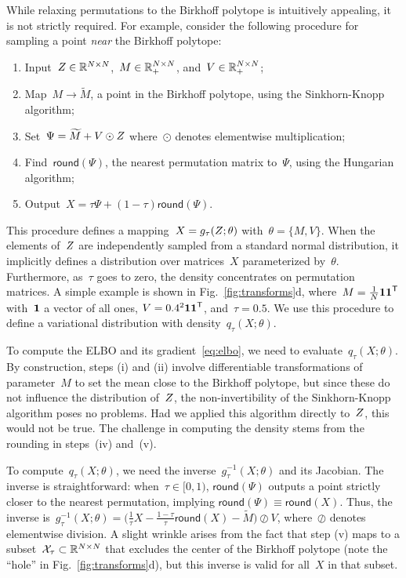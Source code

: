 \documentclass[twoside]{article}
\begin{document}
While relaxing permutations to the Birkhoff polytope is intuitively
appealing, it is not strictly required.  For example, consider the
following procedure for sampling a point \emph{near} the Birkhoff
polytope:
\begin{enumerate}[label=(\roman*)]
\item Input~${Z \in \mathbb{R}^{N \times
      N}}$,~${M \in \mathbb{R}_+^{N \times N}}$,
  and~${V \in \mathbb{R}_+^{N \times N}}$;
\item Map~$M \to \widetilde{M}$, a point in the Birkhoff polytope,
  using the Sinkhorn-Knopp algorithm;
\item Set~${\Psi = \widetilde{M} + V \odot Z}$ where~$\odot$
  denotes elementwise multiplication;
\item Find~$\mathsf{round}(\Psi)$, the nearest permutation matrix
  to~$\Psi$, using the Hungarian algorithm;
\item Output~${X = \tau \Psi + (1-\tau) \mathsf{round}(\Psi)}$.
\end{enumerate}
This procedure defines a mapping~${X = g_\tau(Z; \theta)}$
with~${\theta = \{M, V\}}$. When the elements of~$Z$ are
independently sampled from a standard normal distribution, it
implicitly defines a distribution over matrices~$X$ parameterized
by~${\theta}$. Furthermore, as~$\tau$ goes to zero, the density
concentrates on permutation matrices.  A simple example is shown in
Fig.~\ref{fig:transforms}d,
where~${M = \tfrac{1}{N}\boldsymbol{1} \boldsymbol{1}^{\mathsf{T}}}$ with~$\boldsymbol{1}$ a vector of
all ones, ${V = 0.4^2 \boldsymbol{1} \boldsymbol{1}^{\mathsf{T}}}$, and~${\tau=0.5}$. We use
this procedure to define a variational distribution with
density~$q_\tau(X; \theta)$.

To compute the ELBO and its gradient~\eqref{eq:elbo}, we need to
evaluate~$q_\tau(X; \theta)$.  By construction, steps (i) and (ii)
involve differentiable transformations of parameter~$M$ to set the
mean close to the Birkhoff polytope, but since these do not influence
the distribution of~$Z$, the non-invertibility of the
Sinkhorn-Knopp algorithm poses no problems.  Had we applied this
algorithm directly to~$Z$, this would not be true.  The challenge
in computing the density stems from the rounding in steps~(iv)
and~(v).

To compute~$q_\tau(X; \theta)$, we need the
inverse~$g_\tau^{-1}(X; \theta)$ and its Jacobian.  The inverse is
straightforward: when~${\tau \in [0,1)}$, $\mathsf{round}(\Psi)$
outputs a point strictly closer to the nearest permutation, implying
${\mathsf{round}(\Psi) \equiv \mathsf{round}(X)}$.  Thus, the inverse
is~${g_\tau^{-1}(X; \theta) = \big(\tfrac{1}{\tau}X -
  \tfrac{1-\tau}{\tau} \mathsf{round}(X) - \widetilde{M}\big) \oslash
  V}$, where~$\oslash$ denotes elementwise division.  A slight wrinkle
arises from the fact that step (v) maps to a
subset~${\mathcal{X}_\tau \subset \mathbb{R}^{N \times N}}$ that excludes the
center of the Birkhoff polytope (note the ``hole'' in
Fig.~\ref{fig:transforms}d), but this inverse is valid for all~$X$ in
that subset.
\end{document}
